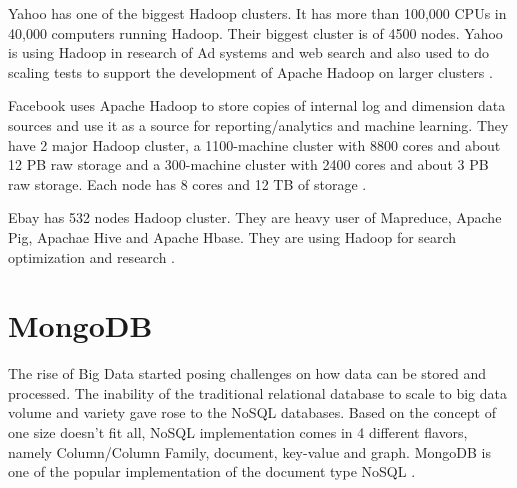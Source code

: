 \documentclass[sigconf]{acmart}
\begin{document}
Yahoo has one of the biggest Hadoop clusters. It has more than 100,000 CPUs in 40,000 computers running Hadoop. Their biggest cluster is of 4500 nodes. Yahoo is using Hadoop in research of Ad systems and web search and also used to do scaling tests to support the development of Apache Hadoop on larger clusters \cite{www-apache-poweredby}.

Facebook uses Apache Hadoop to store copies of internal log and dimension data sources and use it as a source for reporting/analytics and machine learning. They have 2 major Hadoop cluster, a 1100-machine cluster with 8800 cores and about 12 PB raw storage and a 300-machine cluster with 2400 cores and about 3 PB raw storage. Each node has 8 cores and 12 TB of storage \cite{www-apache-poweredby}.

Ebay has 532 nodes Hadoop cluster. They are heavy user of Mapreduce, Apache Pig, Apachae Hive and Apache Hbase. They are using Hadoop for search optimization and research \cite{www-apache-poweredby}. 

\section{MongoDB}
The rise of Big Data started posing challenges on how data can be stored and processed. The inability of the traditional relational database to scale to big data volume and variety gave rose to the NoSQL databases. Based on the concept of one size doesn't fit all, NoSQL implementation comes in 4 different flavors, namely Column/Column Family, document, key-value and graph. MongoDB is one of the popular implementation of the document type NoSQL \cite{Harrison2015}.
\end{document}

